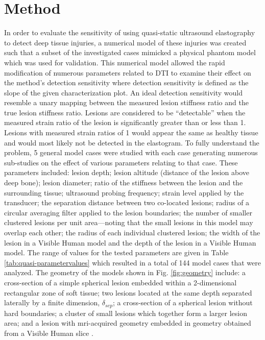 	\section{Method}
		\label{sec:method}
		In order to evaluate the sensitivity of using quasi-static ultrasound elastography to detect deep tissue injuries, a numerical model of these injuries was created such that a subset of the investigated cases mimicked a physical phantom model which was used for validation. This numerical model allowed the rapid modification of numerous parameters related to DTI to examine their effect on the method's detection sensitivity where detection sensitivity is defined as the slope of the given characterization plot. An ideal detection sensitivity would resemble a unary mapping between the measured lesion stiffness ratio and the true lesion stiffness ratio. Lesions are considered to be ``detectable'' when the measured strain ratio of the lesion is significantly greater than or less than 1. Lesions with measured strain ratios of 1 would appear the same as healthy tissue and would most likely not be detected in the elastogram. To fully understand the problem, 5 general model cases were studied with each case generating numerous sub-studies on the effect of various parameters relating to that case. These parameters included: lesion depth; lesion altitude (distance of the lesion above deep bone); lesion diameter; ratio of the stiffness between the lesion and the surrounding tissue; ultrasound probing frequency; strain level applied by the transducer; the separation distance between two co-located lesions; radius of a circular averaging filter applied to the lesion boundaries; the number of smaller clustered lesions per unit area---noting that the small lesions in this model may overlap each other; the radius of each individual clustered lesion; the width of the lesion in a Visible Human \cite{visiblehuman} model and the depth of the lesion in a Visible Human model. The range of values for the tested parameters are given in Table \ref{tab:quasi-parametervalues} which resulted in a total of 144 model cases that were analyzed. The geometry of the models shown in Fig. \ref{fig:geometry} include: a cross-section of a simple spherical lesion embedded within a 2-dimensional rectangular zone of soft tissue; two lesions located at the same depth separated laterally by a finite dimension, $\delta_{sep}$; a cross-section of a spherical lesion without hard boundaries; a cluster of small lesions which together form a larger lesion area; and a lesion with mri-acquired geometry \cite{solis13} embedded in geometry obtained from a Visible Human slice \cite{visiblehuman}.

